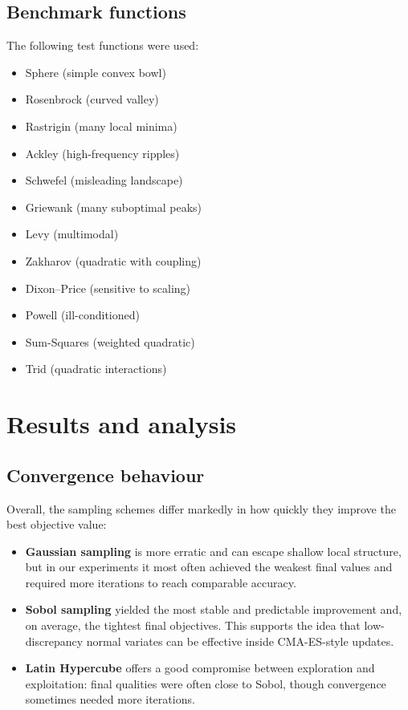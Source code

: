 \documentclass[12pt,a4paper]{article}
\begin{document}
\subsection{Benchmark functions}
The following test functions were used:
\begin{itemize}
    \item Sphere (simple convex bowl)
    \item Rosenbrock (curved valley)
    \item Rastrigin (many local minima)
    \item Ackley (high-frequency ripples)
    \item Schwefel (misleading landscape)
    \item Griewank (many suboptimal peaks)
    \item Levy (multimodal)
    \item Zakharov (quadratic with coupling)
    \item Dixon--Price (sensitive to scaling)
    \item Powell (ill-conditioned)
    \item Sum-Squares (weighted quadratic)
    \item Trid (quadratic interactions)
\end{itemize}

\section{Results and analysis}

\subsection{Convergence behaviour}
Overall, the sampling schemes differ markedly in how quickly they improve the best objective value:
\begin{itemize}
    \item \textbf{Gaussian sampling} is more erratic and can escape shallow local structure, but in our experiments it most often achieved the weakest final values and required more iterations to reach comparable accuracy.
    \item \textbf{Sobol sampling} yielded the most stable and predictable improvement and, on average, the tightest final objectives. This supports the idea that low-discrepancy normal variates can be effective inside CMA-ES-style updates.
    \item \textbf{Latin Hypercube} offers a good compromise between exploration and exploitation: final qualities were often close to Sobol, though convergence sometimes needed more iterations.
\end{itemize}
\end{document}
